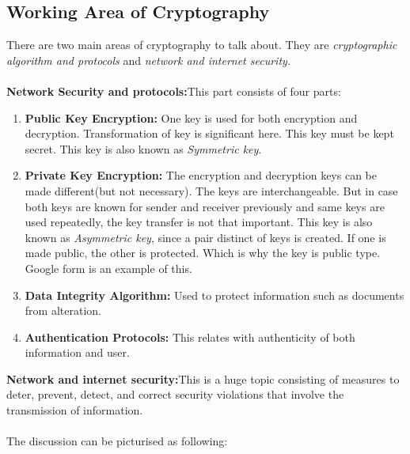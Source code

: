 \documentclass[a4paper,12pt]{article}
\begin{document}
	\subsection{Working Area of Cryptography}
	There are two main areas of cryptography to talk about. They are {\it cryptographic   algorithm and protocols} and {\it network and internet security.\\\\}
	{\bf Network Security and protocols:}This part consists of four parts:
	\begin{enumerate}
		\item {\bf Public Key Encryption:} One key is used for both encryption and decryption. Transformation of key is significant here. This key must be kept secret. This key is also known as {\it Symmetric key}.
		
		\item {\bf Private Key Encryption:} The encryption and decryption keys can be made different(but not necessary). The keys are interchangeable. But in case both keys are known for sender and receiver previously and same keys are used repeatedly, the key transfer is not that important. This key is also known as {\it Asymmetric key}, since a pair distinct of keys is created. If one is made public, the other is protected. Which is why the key is public type. Google form is an example of this.
		
		\item {\bf Data Integrity Algorithm:} Used to protect information such as documents from alteration.
		
		\item {\bf Authentication Protocols:} This relates with authenticity of both information and user.
	\end{enumerate}
{\bf Network and internet security:}This is a huge topic consisting of measures to deter, prevent,
detect, and correct security violations that involve the transmission of information.\\\\
\noindent The discussion can be picturised as following:
\end{document}

